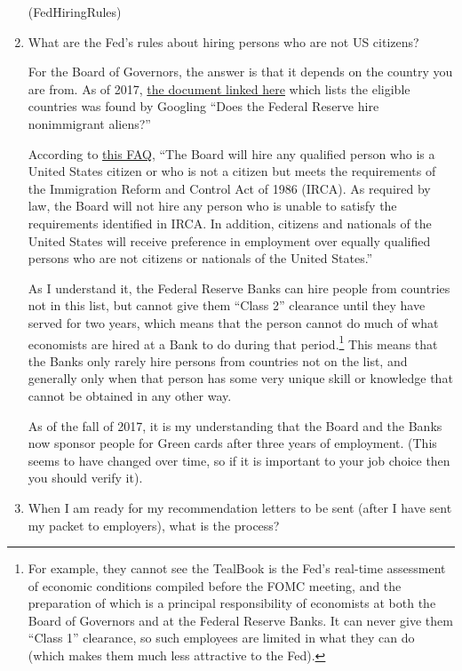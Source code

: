\documentclass{econtex}
\providecommand\phantomsection{}
\begin{document}
\begin{enumerate}
\ifdvi\phantomsection\hypertarget{FedHiringRules}{(FedHiringRules)}\fi

\item {}  What are the Fed's rules about hiring persons who are not US citizens? 

  For the Board of Governors, the answer is that it depends on the country you are from.  As of 2017, \href{https://www.federalreserve.gov/boarddocs/srletters/2006/SR0614a3.pdf}{the document linked here} which lists the eligible countries was found by Googling ``Does the Federal Reserve hire nonimmigrant aliens?'' 

    According to \href{https://www.federalreserve.gov/careers-faqs.htm}{this FAQ}, ``The Board will hire any qualified person who is a United States citizen or who is not a citizen but meets the requirements of the Immigration Reform and Control Act of 1986 (IRCA).  As required by law, the Board will not hire any person who is unable to satisfy the requirements identified in IRCA. In addition, citizens and nationals of the United States will receive preference in employment over equally qualified persons who are not citizens or nationals of the United States.''

      As I understand it, the Federal Reserve Banks can hire people from countries not in this list, but cannot give them ``Class 2'' clearance until they have served for two years, which means that the person cannot do much of what economists are hired at a Bank to do during that period.\footnote{For example, they cannot see the TealBook is the Fed's real-time assessment of economic conditions compiled before the FOMC meeting, and the preparation of which is a principal responsibility of economists at both the Board of Governors and at the Federal Reserve Banks.  It can never give them ``Class 1'' clearance, so such employees are limited in what they can do (which makes them much less attractive to the Fed).}  This means that the Banks only rarely hire persons from countries not on the list, and generally only when that person has some very unique skill or knowledge that cannot be obtained in any other way.

     As of the fall of 2017, it is my understanding that the Board and the Banks now sponsor people for Green cards after three years of employment.  (This seems to have changed over time, so if it is important to your job choice then you should verify it).

\item {} 
When I am ready for my recommendation letters to be sent (after I have
sent my packet to employers), what is the process?


\end{enumerate}
\end{document}
